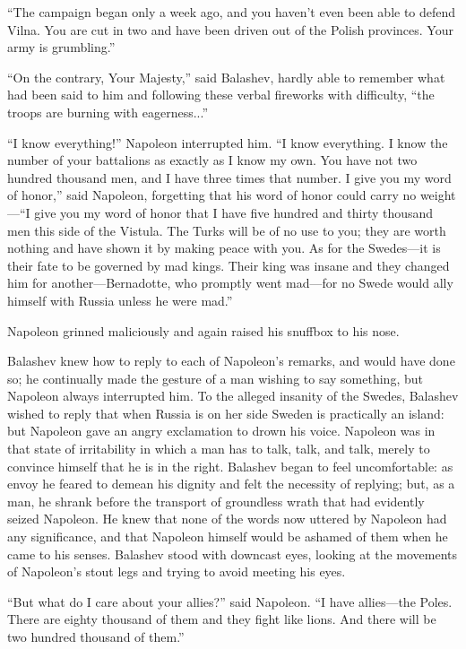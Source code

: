 ``The campaign began only a week ago, and you haven't even been
able to defend Vilna. You are cut in two and have been driven out
of the Polish provinces. Your army is grumbling.''

``On the contrary, Your Majesty,'' said Balashev, hardly able to
remember what had been said to him and following these verbal
fireworks with difficulty, ``the troops are burning with
eagerness...''

``I know everything!'' Napoleon interrupted him. ``I know
everything. I know the number of your battalions as exactly as I
know my own. You have not two hundred thousand men, and I have
three times that number. I give you my word of honor,'' said
Napoleon, forgetting that his word of honor could carry no
weight---``I give you my word of honor that I have five hundred
and thirty thousand men this side of the Vistula. The Turks will
be of no use to you; they are worth nothing and have shown it by
making peace with you. As for the Swedes---it is their fate to be
governed by mad kings. Their king was insane and they changed him
for another---Bernadotte, who promptly went mad---for no Swede
would ally himself with Russia unless he were mad.''

Napoleon grinned maliciously and again raised his snuffbox to his
nose.

Balashev knew how to reply to each of Napoleon's remarks, and
would have done so; he continually made the gesture of a man
wishing to say something, but Napoleon always interrupted him. To
the alleged insanity of the Swedes, Balashev wished to reply that
when Russia is on her side Sweden is practically an island: but
Napoleon gave an angry exclamation to drown his voice. Napoleon
was in that state of irritability in which a man has to talk,
talk, and talk, merely to convince himself that he is in the
right. Balashev began to feel uncomfortable: as envoy he feared
to demean his dignity and felt the necessity of replying; but, as
a man, he shrank before the transport of groundless wrath that
had evidently seized Napoleon. He knew that none of the words now
uttered by Napoleon had any significance, and that Napoleon
himself would be ashamed of them when he came to his
senses. Balashev stood with downcast eyes, looking at the
movements of Napoleon's stout legs and trying to avoid meeting
his eyes.

``But what do I care about your allies?'' said Napoleon. ``I have
allies---the Poles. There are eighty thousand of them and they
fight like lions. And there will be two hundred thousand of
them.''

